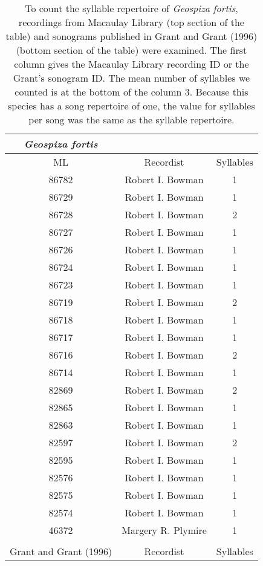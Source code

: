 \documentclass[a4paper,12pt]{article}
\begin{document}
\begin{longtable}{ccc}
\caption{To count the syllable repertoire of \textit{Geospiza fortis}, recordings from Macaulay Library (top section of the table) and sonograms published in Grant and Grant (1996) (bottom section of the table) were examined. The first column gives the Macaulay Library  recording ID or the Grant's sonogram ID. The mean number of syllables we counted is at the bottom of the column 3. Because this species has a song repertoire of one, the value for syllables per song was the same as the syllable repertoire.}\\
\hline
\textit{Geospiza fortis} & & \\
\hline
ML & Recordist & Syllables  \\
\hline
  86782 & Robert I. Bowman  & 1 \\ 
  86729 & Robert I. Bowman  & 1 \\ 
  86728 & Robert I. Bowman  & 2 \\ 
  86727 & Robert I. Bowman  & 1 \\ 
  86726 & Robert I. Bowman  & 1 \\ 
  86724 & Robert I. Bowman  & 1 \\ 
  86723 & Robert I. Bowman  & 1 \\ 
  86719 & Robert I. Bowman  & 2 \\ 
  86718 & Robert I. Bowman  & 1 \\ 
  86717 & Robert I. Bowman  & 1 \\ 
  86716 & Robert I. Bowman  & 2 \\ 
  86714 & Robert I. Bowman  & 1 \\ 
  82869 & Robert I. Bowman  & 2 \\ 
  82865 & Robert I. Bowman  & 1 \\ 
  82863 & Robert I. Bowman  & 1 \\ 
  82597 & Robert I. Bowman  & 2 \\ 
  82595 & Robert I. Bowman  & 1 \\ 
  82576 & Robert I. Bowman  & 1 \\ 
  82575 & Robert I. Bowman  & 1 \\ 
  82574 & Robert I. Bowman  & 1 \\ 
  46372 & Margery R. Plymire  & 1 \\
  \hline
  \\
  Grant and Grant (1996) &  Recordist & Syllables  \\

\end{longtable}
\end{document}
